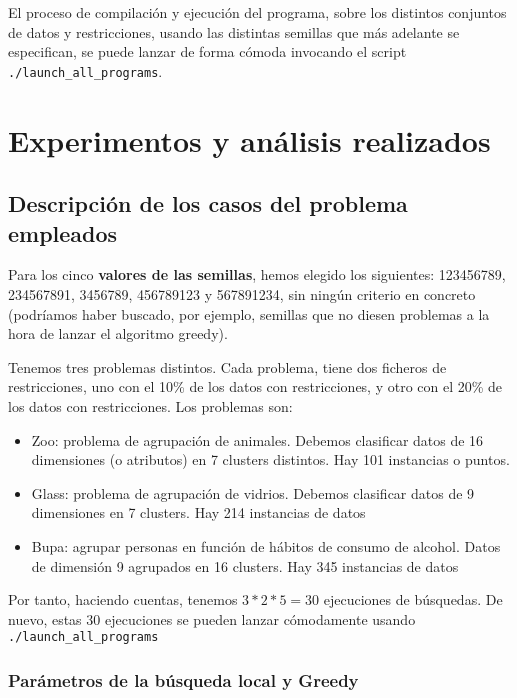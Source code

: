 \documentclass[11pt]{article}
\begin{document}
El proceso de compilación y ejecución del programa, sobre los distintos conjuntos de datos y restricciones, usando las distintas semillas que más adelante se especifican, se puede lanzar de forma cómoda invocando el script \lstinline{./launch_all_programs}.

\pagebreak

\section{Experimentos y análisis realizados}

\subsection{Descripción de los casos del problema empleados}

Para los cinco \textbf{valores de las semillas}, hemos elegido los siguientes: 123456789, 234567891, 3456789, 456789123 y 567891234, sin ningún criterio en concreto (podríamos haber buscado, por ejemplo, semillas que no diesen problemas a la hora de lanzar el algoritmo greedy).

Tenemos tres problemas distintos. Cada problema, tiene dos ficheros de restricciones, uno con el 10\% de los datos con restricciones, y otro con el 20\% de los datos con restricciones. Los problemas son:

\begin{itemize}
    \item Zoo: problema de agrupación de animales. Debemos clasificar datos de 16 dimensiones (o atributos) en 7 clusters distintos. Hay 101 instancias o puntos.
    \item Glass: problema de agrupación de vidrios. Debemos clasificar datos de 9 dimensiones en 7 clusters. Hay 214 instancias de datos
    \item Bupa: agrupar personas en función de hábitos de consumo de alcohol. Datos de dimensión 9 agrupados en 16 clusters. Hay 345 instancias de datos
\end{itemize}

Por tanto, haciendo cuentas, tenemos $3 * 2 * 5 = 30$ ejecuciones de búsquedas. De nuevo, estas 30 ejecuciones se pueden lanzar cómodamente usando \lstinline{./launch_all_programs}

\subsubsection{Parámetros de la búsqueda local y Greedy}
\end{document}
